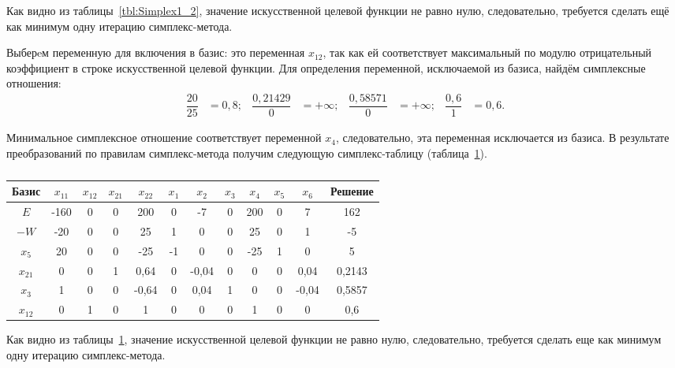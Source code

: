 Как видно из таблицы~\ref{tbl:Simplex1_2}, значение искусственной
целевой функции не равно нулю, следовательно, требуется сделать ещё
как минимум одну итерацию симплекс-метода.

Выберeм переменную для включения в базис: это переменная $ x_{12} $, так как
ей соответствует максимальный по модулю отрицательный коэффициент в
строке искусственной целевой функции.
Для определения переменной, исключаемой из базиса, найдём
симплексные отношения:
\begin{align}
  \dfrac{20}{25} & = 0{,}8; &
  \dfrac{0{,}21429}{0} & = +\infty; &
  \dfrac{0{,}58571}{0} & = +\infty; &
  \dfrac{0{,}6}{1} & = 0{,}6.
\end{align}

Минимальное симплексное отношение соответствует переменной $ x_{4} $, следовательно,
эта переменная исключается из базиса.
В результате преобразований по правилам симплекс-метода получим 
следующую симплекс-таблицу (таблица~\ref{tbl:Simplex1_3}).

\begin{table}[h]
  \centering
    \caption{\label{tbl:Simplex1_3}}
    \begin{tabular}{|c|c|c|c|c|c|c|c|c|c|c|c|}
      \hline
      Базис & $ x_{11} $ & $ x_{12} $ & $ x_{21} $ & $ x_{22} $ & $ x_{1} $ & $ x_{2} $ & $ x_{3} $ & $ x_{4} $ & $ x_{5} $ & $ x_{6} $ & Решение \\  
      \hline
      $ E $ & -160 & 0 & 0 & 200 & 0 & -7 & 0 & 200 & 0 & 7 & 162 \\  
      \hline
      $ -W $ & -20 & 0 & 0 & 25 & 1 & 0 & 0 & 25 & 0 & 1 & -5 \\  
      \hline
      $ x_{5} $ & 20 & 0 & 0 & -25 & -1 & 0 & 0 & -25 & 1 & 0 & 5 \\  
      \hline
      $ x_{21} $ & 0 & 0 & 1 & 0{,}64 & 0 & -0{,}04 & 0 & 0 & 0 & 0{,}04 & 0{,}2143 \\  
      \hline
      $ x_{3} $ & 1 & 0 & 0 & -0{,}64 & 0 & 0{,}04 & 1 & 0  & 0 & -0{,}04 & 0{,}5857 \\  
      \hline
      $ x_{12} $ & 0 & 1 & 0 & 1 & 0 & 0 & 0 & 1 & 0 & 0 & 0{,}6 \\  
      \hline
    \end{tabular}
\end{table}


Как видно из таблицы~\ref{tbl:Simplex1_3}, значение искусственной
целевой функции не равно нулю, следовательно, требуется сделать
еще как минимум одну итерацию симплекс-метода.

